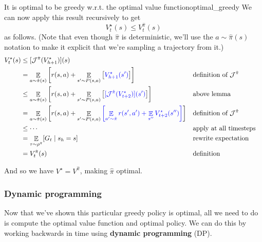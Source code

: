 \documentclass[\main/main]{subfiles}
\begin{document}
\begin{theorem}{It is optimal to be greedy w.r.t. the optimal value function}{optimal_greedy}
    We can now apply this result recursively to get
    \[
    V^{\star}_t(s) \le V^{\hat \pi}_t(s)
    \]
    as follows. (Note that even though $\hat \pi$ is deterministic, we'll use the $a \sim \hat \pi(s)$ notation to make it explicit that we're sampling a trajectory from it.)
    \begin{align*}
    V_{t}^{\star}(s) &\le [\mathcal{J}^{\hat \pi}(V_{h+1}^{\star})](s) \\
    &= \mathop{\mathbb{E}}_{a \sim \hat \pi(s)} \left[ r(s, a) + \mathop{\mathbb{E}}_{s' \sim P(s, a)} \left[ {\color{blue} V_{h+1}^{\star}(s')} \right] \right] && \text{definition of } \mathcal{J}^{\hat \pi} \\
    &\le \mathop{\mathbb{E}}_{a \sim \hat \pi(s)} \left[ r(s, a) + \mathop{\mathbb{E}}_{s' \sim P(s, a)} \left[ {\color{blue}[ \mathcal{J}^{\hat \pi} (V_{t+2}^{\star})] (s')} \right] \right] && \text{above lemma} \\
    &= \mathop{\mathbb{E}}_{a \sim \hat \pi(s)} \left[ r(s, a) + \mathop{\mathbb{E}}_{s' \sim P(s, a)}{\color{blue} \left[ \mathop{\mathbb{E}}_{a' \sim \hat \pi}  r(s', a') + \mathop{\mathbb{E}}_{s''} V_{t+2}^{\star}(s'') \right]} \right] && \text{definition of } \mathcal{J}^{\hat \pi} \\
    &\le \cdots && \text{apply at all timesteps} \\
    &= \mathop{\mathbb{E}}_{\tau \sim \rho^{\hat \pi}} [G_{t} \mid s_h = s] && \text{rewrite expectation} \\
    &= V_{t}^{\hat \pi}(s) && \text{definition}
    \end{align*}

    And so we have $V^{\star} = V^{\hat \pi}$, making $\hat \pi$ optimal.
\end{theorem}


\subsubsection{Dynamic programming}

Now that we've shown this particular greedy policy is optimal, all we need to do is compute the optimal value function and optimal policy. We can do this by working backwards in time using \textbf{dynamic programming} (DP).
\end{document}
